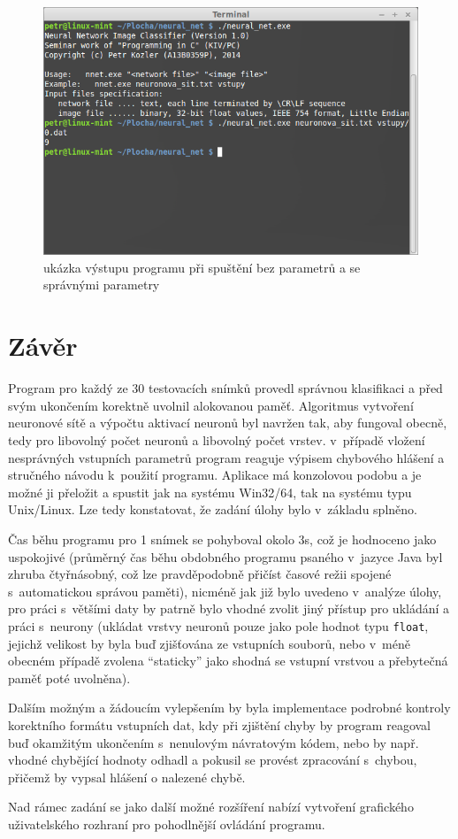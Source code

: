 \documentclass[12pt, a4paper, titlepage]{report}
\begin{document}
\begin{figure}[htbp]
    \centering
    \includegraphics[width=12cm]{img/run.png}
    \caption{ukázka výstupu programu při spuštění bez parametrů a se správnými parametry}
    \label{fig:run}
\end{figure}

\newpage

\chapter{Závěr}
Program pro každý ze 30 testovacích snímků provedl správnou klasifikaci a před svým ukončením korektně uvolnil alokovanou paměť. Algoritmus vytvoření neuronové sítě a výpočtu aktivací neuronů byl navržen tak, aby fungoval obecně, tedy pro libovolný počet neuronů a libovolný počet vrstev. v~případě vložení nesprávných vstupních parametrů program reaguje výpisem chybového hlášení a stručného návodu k~použití programu. Aplikace má konzolovou podobu a je možné ji přeložit a spustit jak na systému Win32/64, tak na systému typu Unix/Linux. Lze tedy konstatovat, že zadání úlohy bylo v~základu splněno.\par
Čas běhu programu pro 1 snímek se pohyboval okolo 3s, což je hodnoceno jako uspokojivé (průměrný čas běhu obdobného programu psaného v~jazyce Java byl zhruba čtyřnásobný, což lze pravděpodobně přičíst časové režii spojené s~automatickou správou paměti), nicméně jak již bylo uvedeno v~analýze úlohy, pro práci s~většími daty by patrně bylo vhodné zvolit jiný přístup pro ukládání a práci s~neurony (ukládat vrstvy neuronů pouze jako pole hodnot typu \texttt{float}, jejichž velikost by byla buď zjišťována ze vstupních souborů, nebo v~méně obecném případě zvolena “staticky” jako shodná se vstupní vrstvou a přebytečná paměť poté uvolněna).\par
Dalším možným a žádoucím vylepšením by byla implementace podrobné kontroly korektního formátu vstupních dat, kdy při zjištění chyby by program reagoval buď okamžitým ukončením s~nenulovým návratovým kódem, nebo by např. vhodné chybějící hodnoty odhadl a pokusil se provést zpracování s~chybou, přičemž by vypsal hlášení o nalezené chybě.\par
Nad rámec zadání se jako další možné rozšíření nabízí vytvoření grafického uživatelského rozhraní pro pohodlnější ovládání programu.
\end{document}
